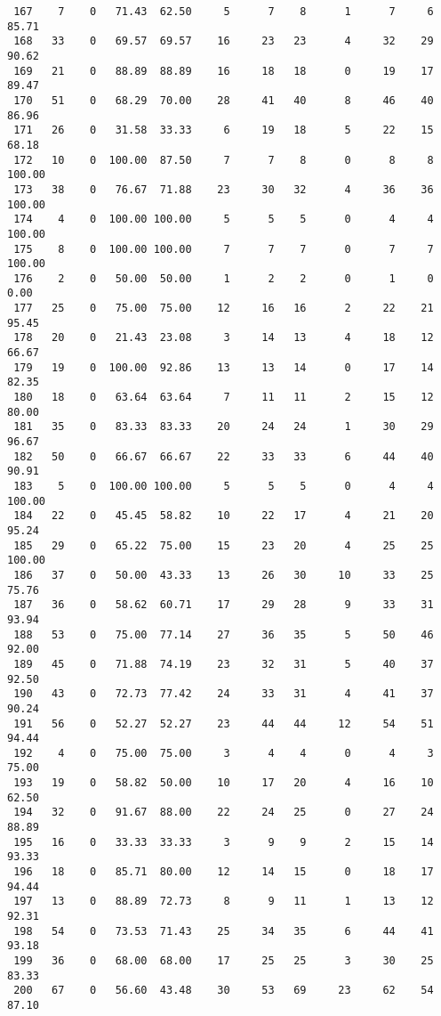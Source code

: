 \begin{verbatim}
 167    7    0   71.43  62.50     5      7    8      1      7     6    85.71
 168   33    0   69.57  69.57    16     23   23      4     32    29    90.62
 169   21    0   88.89  88.89    16     18   18      0     19    17    89.47
 170   51    0   68.29  70.00    28     41   40      8     46    40    86.96
 171   26    0   31.58  33.33     6     19   18      5     22    15    68.18
 172   10    0  100.00  87.50     7      7    8      0      8     8   100.00
 173   38    0   76.67  71.88    23     30   32      4     36    36   100.00
 174    4    0  100.00 100.00     5      5    5      0      4     4   100.00
 175    8    0  100.00 100.00     7      7    7      0      7     7   100.00
 176    2    0   50.00  50.00     1      2    2      0      1     0     0.00
 177   25    0   75.00  75.00    12     16   16      2     22    21    95.45
 178   20    0   21.43  23.08     3     14   13      4     18    12    66.67
 179   19    0  100.00  92.86    13     13   14      0     17    14    82.35
 180   18    0   63.64  63.64     7     11   11      2     15    12    80.00
 181   35    0   83.33  83.33    20     24   24      1     30    29    96.67
 182   50    0   66.67  66.67    22     33   33      6     44    40    90.91
 183    5    0  100.00 100.00     5      5    5      0      4     4   100.00
 184   22    0   45.45  58.82    10     22   17      4     21    20    95.24
 185   29    0   65.22  75.00    15     23   20      4     25    25   100.00
 186   37    0   50.00  43.33    13     26   30     10     33    25    75.76
 187   36    0   58.62  60.71    17     29   28      9     33    31    93.94
 188   53    0   75.00  77.14    27     36   35      5     50    46    92.00
 189   45    0   71.88  74.19    23     32   31      5     40    37    92.50
 190   43    0   72.73  77.42    24     33   31      4     41    37    90.24
 191   56    0   52.27  52.27    23     44   44     12     54    51    94.44
 192    4    0   75.00  75.00     3      4    4      0      4     3    75.00
 193   19    0   58.82  50.00    10     17   20      4     16    10    62.50
 194   32    0   91.67  88.00    22     24   25      0     27    24    88.89
 195   16    0   33.33  33.33     3      9    9      2     15    14    93.33
 196   18    0   85.71  80.00    12     14   15      0     18    17    94.44
 197   13    0   88.89  72.73     8      9   11      1     13    12    92.31
 198   54    0   73.53  71.43    25     34   35      6     44    41    93.18
 199   36    0   68.00  68.00    17     25   25      3     30    25    83.33
 200   67    0   56.60  43.48    30     53   69     23     62    54    87.10

\end{verbatim}
